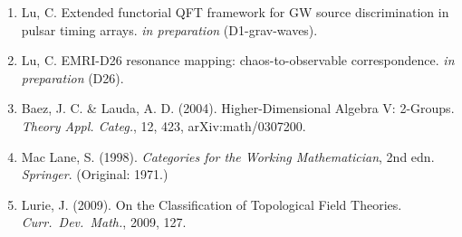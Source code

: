 \documentclass[
]{article}
\begin{document}
\begin{enumerate}
  Gelfand, I. \& Naimark, M. (1943). On the imbedding of normed rings.
  \emph{Uspekhi Mat. Nauk}, 8, 3-33.
\item
  Lu, C. Extended functorial QFT framework for GW source discrimination
  in pulsar timing arrays. \emph{in preparation} (D1-grav-waves).
\item
  Lu, C. EMRI-D26 resonance mapping: chaos-to-observable
  correspondence. \emph{in preparation} (D26).
\item\label{baez-lauda}
  Baez, J. C. \& Lauda, A. D. (2004). Higher-Dimensional Algebra V:
  2-Groups. \emph{Theory Appl. Categ.}, 12, 423, arXiv:math/0307200.
\item\label{mac-lane}
  Mac Lane, S. (1998). \emph{Categories for the Working Mathematician},
  2nd edn. \emph{Springer}. (Original: 1971.)
\item
  Lurie, J. (2009). On the Classification of Topological Field
  Theories. \emph{Curr.\ Dev.\ Math.}, 2009, 127.
\end{enumerate}
\end{document}
